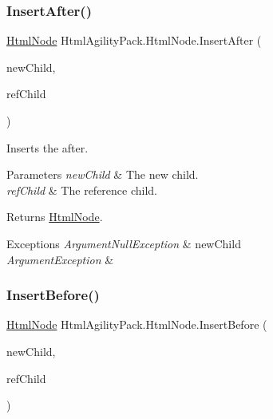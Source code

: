 \subsubsection{\texorpdfstring{Insert\+After()}{InsertAfter()}}
{\footnotesize\ttfamily \hyperlink{class_html_agility_pack_1_1_html_node}{Html\+Node} Html\+Agility\+Pack.\+Html\+Node.\+Insert\+After (\begin{DoxyParamCaption}\item[{\hyperlink{class_html_agility_pack_1_1_html_node}{Html\+Node}}]{new\+Child,  }\item[{\hyperlink{class_html_agility_pack_1_1_html_node}{Html\+Node}}]{ref\+Child }\end{DoxyParamCaption})\hspace{0.3cm}{\ttfamily [inline]}}



Inserts the after. 


\begin{DoxyParams}{Parameters}
{\em new\+Child} & The new child.\\
\hline
{\em ref\+Child} & The reference child.\\
\hline
\end{DoxyParams}
\begin{DoxyReturn}{Returns}
\hyperlink{class_html_agility_pack_1_1_html_node}{Html\+Node}.
\end{DoxyReturn}

\begin{DoxyExceptions}{Exceptions}
{\em Argument\+Null\+Exception} & new\+Child\\
\hline
{\em Argument\+Exception} & \\
\hline
\end{DoxyExceptions}
\mbox{\label{class_html_agility_pack_1_1_html_node_a7f42a331f6d29d079254604268e75f49}} 
\subsubsection{\texorpdfstring{Insert\+Before()}{InsertBefore()}}
{\footnotesize\ttfamily \hyperlink{class_html_agility_pack_1_1_html_node}{Html\+Node} Html\+Agility\+Pack.\+Html\+Node.\+Insert\+Before (\begin{DoxyParamCaption}\item[{\hyperlink{class_html_agility_pack_1_1_html_node}{Html\+Node}}]{new\+Child,  }\item[{\hyperlink{class_html_agility_pack_1_1_html_node}{Html\+Node}}]{ref\+Child }\end{DoxyParamCaption})\hspace{0.3cm}{\ttfamily [inline]}}



